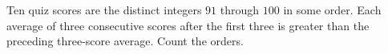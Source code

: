 Ten quiz scores are the distinct integers $91$ through $100$ in some order. Each average of three consecutive scores after the first three is greater than the preceding three-score average. Count the orders.
